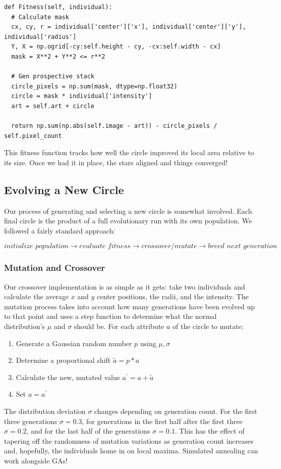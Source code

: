 \documentclass[12pt]{article}
\begin{document}
\begin{verbatim}
def Fitness(self, individual):
  # Calculate mask
  cx, cy, r = individual['center']['x'], individual['center']['y'], individual['radius']
  Y, X = np.ogrid[-cy:self.height - cy, -cx:self.width - cx]
  mask = X**2 + Y**2 <= r**2                
  
  # Gen prospective stack
  circle_pixels = np.sum(mask, dtype=np.float32)
  circle = mask * individual['intensity']
  art = self.art + circle

  return np.sum(np.abs(self.image - art)) - circle_pixels / self.pixel_count
\end{verbatim}

This fitness function tracks how well the circle improved its local area relative to its size. Once we had it in place, the stars aligned and things converged!

\subsection{Evolving a New Circle}
Our process of generating and selecting a new circle is somewhat involved. Each final circle is the product of a full evolutionary run with its own population. We followed a fairly standard approach:

$$
\textit{initialize population}
\rightarrow\textit{evaluate fitness}
\rightarrow\textit{crossover/mutate}
\rightarrow\textit{breed next generation}
$$

\subsubsection{Mutation and Crossover}
Our crossover implementation is as simple as it gets: take two individuals and calculate the average $x$ and $y$ center positions, the radii, and the intensity. The mutation process takes into account how many generations have been evolved up to that point and uses a step function to determine what the normal distribution's $\mu$ and $\sigma$ should be. For each attribute $a$ of the circle to mutate:
\begin{enumerate}
\item Generate a Gaussian random number $p$ using $\mu, \sigma$
\item Determine a proportional shift $\tilde{a} = p*a$
\item Calculate the new, mutated value $a^{\prime} = a + \tilde{a}$
\item Set $a = a^{\prime}$ 
\end{enumerate}
The distribution deviation $\sigma$ changes depending on generation count. For the first three generations $\sigma = 0.3$, for generations in the first half after the first three $\sigma = 0.2$, and for the last half of the generations $\sigma = 0.1$. This has the effect of tapering off the randomness of mutation variations as generation count increases and, hopefully, the individuals home in on local maxima. Simulated annealing can work alongside GAs!
\end{document}
